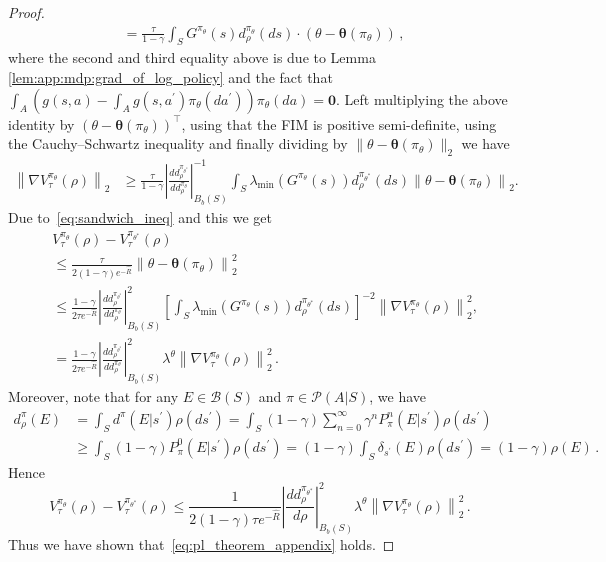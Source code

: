 \documentclass{amsart}
\theoremstyle{definition}
\begin{document}
\begin{proof}
\begin{align}
& = \frac{\tau}{1-\gamma} \int_{S} G^{\pi_\theta}(s)d_{\rho}^{\pi_{\theta}}(ds)\cdot(\theta -\boldsymbol{\theta}(\pi_\theta))\, , \ \label{eq:grad_for_PL}
\end{align}
where the second and third equality above is due to Lemma \ref{lem:app:mdp:grad_of_log_policy} and the fact that $\int_A (g(s,a) - \int_A g(s,a^\prime)\pi_\theta(da^\prime))\pi_\theta(da) = \mathbf 0$. 
Left multiplying the above identity by $(\theta-\boldsymbol{\theta}(\pi_\theta))^\top$, using that the FIM is positive semi-definite, using the Cauchy--Schwartz inequality and finally dividing by $\|\theta-\boldsymbol{\theta}(\pi_\theta)\|_2$ we have
\begin{align*}
\left\|\nabla V_\tau^{\pi_\theta}(\rho)\right\|_2 & \geq \frac{\tau}{1-\gamma} \left|\frac{d d_\rho^{\pi_{\theta^*}}}{d d_{\rho}^{\pi_{\theta}}}\right|_{B_b(S)}^{-1} \int_{S} \lambda_{\min}\left(G^{\pi_\theta}(s)\right)d_{\rho}^{\pi_{\theta^*}}(ds)\left\|\theta -\boldsymbol{\theta}(\pi_\theta)\right\|_{2} .
\end{align*}
Due to~\eqref{eq:sandwich_ineq} and this we get
\begin{align*}
& V_\tau^{\pi_\theta}(\rho) - V_\tau^{\pi_{\theta^*}}(\rho)\\
& \leq \frac{\tau }{2(1-\gamma)e^{-\hat{R}}}\left\|\theta - \boldsymbol{\theta}(\pi_\theta)\right\|_{2}^2\\
& \leq \frac{1-\gamma}{2\tau e^{-\hat{R}}}\left|\frac{d d_\rho^{\pi_{\theta^*}}}{ d d_{\rho}^{\pi_\theta}}\right|^2_{B_b(S)} \left[\int_{S} \lambda_{\min}(G^{\pi_\theta}(s))d_\rho^{\pi_{\theta^*}}(ds)\right]^{-2} \left\|\nabla V_\tau^{\pi_\theta}(\rho)\right\|_2^2, \\
& = \frac{1-\gamma}{2\tau e^{-\hat{R}}}\left|\frac{d d_\rho^{\pi_{\theta^*}}}{ d d_{\rho}^{\pi_\theta}}\right|^2_{B_b(S)}  \lambda^\theta \left\|\nabla V_\tau^{\pi_\theta}(\rho)\right\|_2^2\,. 
\end{align*}
Moreover, note that for any $E \in \mathcal{B}(S)$ and $\pi \in \mathcal{P}(A | S)$, we have
\begin{equation}
\label{eq:kernel_occ_geq_rho}
\begin{split}
d_\rho^\pi(E) & =\int_S d^\pi\left(E | s^{\prime}\right) \rho\left(d s^{\prime}\right)=\int_S(1-\gamma) \sum_{n=0}^{\infty} \gamma^n P_\pi^n\left(E | s^{\prime}\right) \rho\left(d s^{\prime}\right) \\
& \geq \int_S(1-\gamma) P_\pi^0\left(E | s^{\prime}\right) \rho\left(d s^{\prime}\right)=(1-\gamma) \int_S \delta_{s^{\prime}}(E) \rho\left(d s^{\prime}\right)=(1-\gamma) \rho(E)\,. 
\end{split}
\end{equation}
Hence 
\[
V_\tau^{\pi_\theta}(\rho) - V_\tau^{\pi_{\theta^*}}(\rho) 
\leq \frac{1}{2(1-\gamma)\tau e^{-\hat{R}}}\left|\frac{d d_\rho^{\pi_{\theta^*}}}{ d \rho}\right|^2_{B_b(S)}  \lambda^\theta \left\|\nabla V_\tau^{\pi_\theta}(\rho)\right\|_2^2\,.
\]
Thus we have shown that~\eqref{eq:pl_theorem_appendix} holds.


\end{proof}
\end{document}
